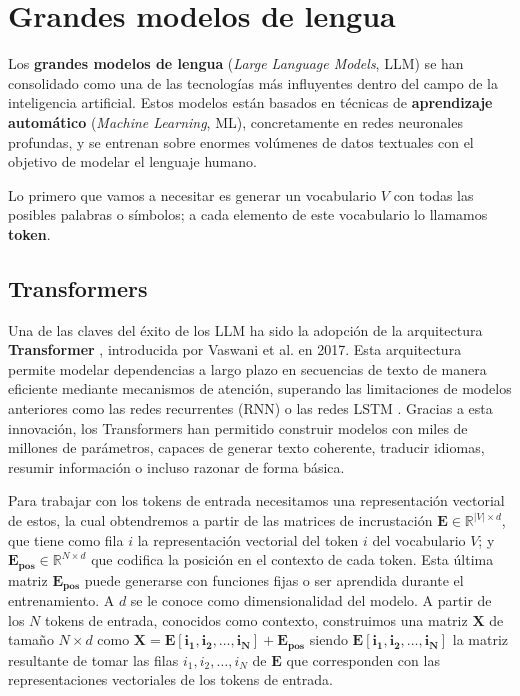 \documentclass[12pt,twoside]{article}
\newcommand{\abs}[1]{\ensuremath{|#1|}}
\begin{document}
\section{Grandes modelos de lengua}
Los \textbf{grandes modelos de lengua} (\textit{Large Language Models}, LLM) \cite{libro} se han consolidado como una de las tecnologías más influyentes dentro del campo de la inteligencia artificial. Estos modelos están basados en técnicas de \textbf{aprendizaje automático} (\textit{Machine Learning}, ML), concretamente en redes neuronales profundas, y se entrenan sobre enormes volúmenes de datos textuales con el objetivo de modelar el lenguaje humano.

Lo primero que vamos a necesitar es generar un vocabulario $V$ con todas las posibles palabras o símbolos; a cada elemento de este vocabulario lo llamamos \textbf{token}.

\subsection{Transformers}
Una de las claves del éxito de los LLM ha sido la adopción de la arquitectura \textbf{Transformer} \cite{transformer}, introducida por Vaswani et al. en 2017. Esta arquitectura permite modelar dependencias a largo plazo en secuencias de texto de manera eficiente mediante mecanismos de atención, superando las limitaciones de modelos anteriores como las redes recurrentes (RNN) o las redes LSTM \cite{LSTM}. Gracias a esta innovación, los Transformers han permitido construir modelos con miles de millones de parámetros, capaces de generar texto coherente, traducir idiomas, resumir información o incluso razonar de forma básica.

Para trabajar con los tokens de entrada necesitamos una representación vectorial de estos, la cual obtendremos a partir de las matrices de incrustación $\mathbf{E}\in\mathbb{R}^{\abs{V}\times d}$, que tiene como fila $i$ la representación vectorial del token $i$ del vocabulario $V$; y $\mathbf{E_{pos}}\in\mathbb{R}^{N\times d}$ que codifica la posición en el contexto de cada token. Esta última matriz $\mathbf{E_{pos}}$ puede generarse con funciones fijas o ser aprendida durante el entrenamiento. A $d$ se le conoce como dimensionalidad del modelo. A partir de los $N$ tokens de entrada, conocidos como contexto, construimos una matriz $\mathbf{X}$ de tamaño $N\times d$ como $\mathbf{X=E[i_1,i_2,\dots,i_N]+E_{pos}}$ siendo $\mathbf{E[i_1,i_2,\dots,i_N]}$ la matriz resultante de tomar las filas $i_1,i_2,\dots,i_N$ de $\mathbf{E}$ que corresponden con las representaciones vectoriales de los tokens de entrada.
\end{document}
